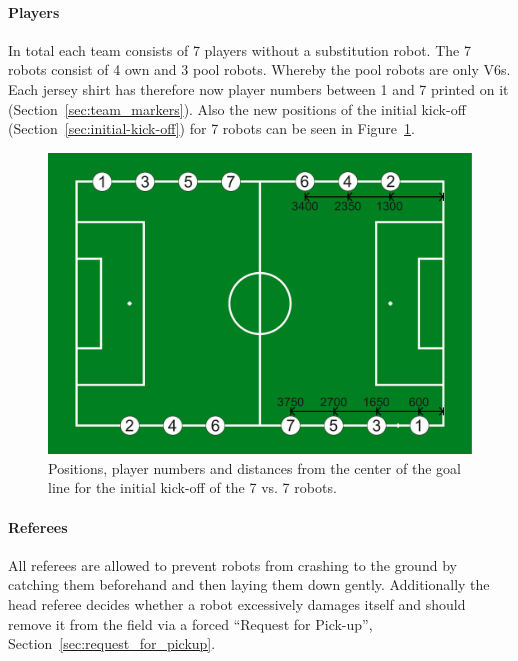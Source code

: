        \paragraph{Players}
            In total each team consists of 7 players without a substitution robot. The 7 robots consist of 4 own and 3 pool robots. Whereby the pool robots are only V6s. Each jersey shirt has therefore now player numbers between 1 and 7 printed on it (\cf Section~\ref{sec:team_markers}). Also the new positions of the initial kick-off (\cf Section~\ref{sec:initial-kick-off}) for 7 robots can be seen in Figure~\ref{fig:initial_positions_7vs7}.
            \begin{figure}[t!]
            	\begin{center}
            		\leavevmode
            		\includegraphics[width=1\columnwidth]{figs/initial_positions_7vs7.pdf}
            		\caption{Positions, player numbers and distances from the center of the goal line for the initial kick-off of the 7 vs. 7 robots.}
            		\label{fig:initial_positions_7vs7}
            	\end{center}
            \end{figure}

        \paragraph{Referees}
            \label{sec:7vs7:referee}
            All referees are allowed to prevent robots from crashing to the ground by catching them beforehand and then laying them down gently. Additionally the head referee decides whether a robot excessively damages itself and should remove it from the field via a forced “Request for Pick-up”, \cf Section~\ref{sec:request_for_pickup}.

